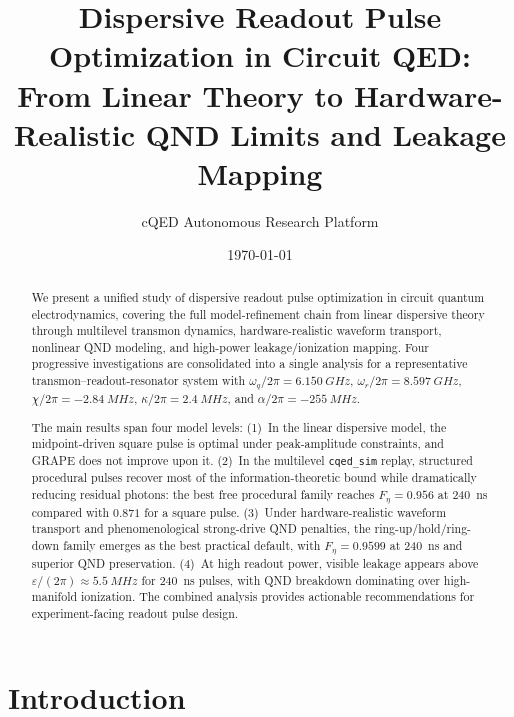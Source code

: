 \documentclass[aps,pra,twocolumn,reprint,amsmath,amssymb]{revtex4-2}
\begin{document}
\title{Dispersive Readout Pulse Optimization in Circuit QED:
From Linear Theory to Hardware-Realistic QND Limits and Leakage Mapping}
\author{cQED Autonomous Research Platform}
\date{\today}

\begin{abstract}
We present a unified study of dispersive readout pulse optimization in circuit quantum electrodynamics, covering the full model-refinement chain from linear dispersive theory through multilevel transmon dynamics, hardware-realistic waveform transport, nonlinear QND modeling, and high-power leakage/ionization mapping. Four progressive investigations are consolidated into a single analysis for a representative transmon--readout-resonator system with $\omega_q/2\pi=\SI{6.150}{GHz}$, $\omega_r/2\pi=\SI{8.597}{GHz}$, $\chi/2\pi=\SI{-2.84}{MHz}$, $\kappa/2\pi=\SI{2.4}{MHz}$, and $\alpha/2\pi=\SI{-255}{MHz}$.

The main results span four model levels: (1)~In the linear dispersive model, the midpoint-driven square pulse is optimal under peak-amplitude constraints, and GRAPE does not improve upon it. (2)~In the multilevel \texttt{cqed\_sim} replay, structured procedural pulses recover most of the information-theoretic bound while dramatically reducing residual photons: the best free procedural family reaches $F_\eta=0.956$ at \SI{240}{ns} compared with $0.871$ for a square pulse. (3)~Under hardware-realistic waveform transport and phenomenological strong-drive QND penalties, the ring-up/hold/ring-down family emerges as the best practical default, with $F_\eta=0.9599$ at \SI{240}{ns} and superior QND preservation. (4)~At high readout power, visible leakage appears above $\varepsilon/(2\pi)\approx\SI{5.5}{MHz}$ for \SI{240}{ns} pulses, with QND breakdown dominating over high-manifold ionization. The combined analysis provides actionable recommendations for experiment-facing readout pulse design.
\end{abstract}

\maketitle

\section{Introduction}
\end{document}
